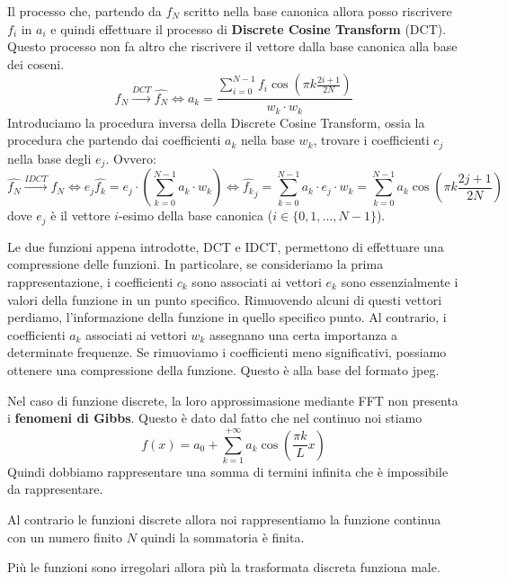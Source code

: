 Il processo che, partendo da $f_N$ scritto nella base canonica allora posso
riscrivere $f_i$ in $a_i$ e quindi effettuare il processo di \textbf{Discrete
    Cosine Transform} (DCT). Questo processo non fa altro che riscrivere il
vettore dalla base canonica alla base dei coseni.
\begin{equation*}
    f_N \stackrel{DCT}{\to } \hat{f_N} \iff a_k = \frac{\sum_{i = 0}^{N-1}f_i\cos
        \left(\pi k \frac{2i +1}{2N}\right)}{w_k\cdot w_k}
\end{equation*}
Introduciamo la procedura inversa della Discrete Cosine Transform, ossia la
procedura che partendo dai coefficienti $a_k$ nella base $w_k$, trovare i
coefficienti $c_j$ nella base degli $e_j$. Ovvero:
\begin{equation*}
    \hat{f_N} \stackrel{IDCT}{\to} f_N \iff e_j \hat{f_k} = e_j \cdot
    \left(\sum_{k=0}^{N-1}a_k \cdot w_k\right) \iff \hat{f_k}_j = \sum_{k=0}^{N-1}
    a_k \cdot e_j \cdot w_k = \sum_{k=0}^{N-1} a_k \cos\left(\pi k \frac{2j+1}{2N}\right)
\end{equation*}
dove $e_j$ è il vettore $i$-esimo della base canonica ($i\in \{0,1,\dots, N-1\}$).

Le due funzioni appena introdotte, DCT e IDCT, permettono di effettuare una
compressione delle funzioni. In particolare, se consideriamo la prima rappresentazione,
i coefficienti $c_k$ sono associati ai vettori $e_k$ sono essenzialmente i valori
della funzione in un punto specifico. Rimuovendo alcuni di questi vettori perdiamo,
l'informazione della funzione in quello specifico punto. Al contrario, i coefficienti
$a_k$ associati ai vettori $w_k$ assegnano una certa importanza a determinate
frequenze. Se rimuoviamo i coefficienti meno significativi, possiamo ottenere una
compressione della funzione. Questo è alla base del formato jpeg.

\begin{nota}
    Nel caso di funzione discrete, la loro approssimasione mediante FFT non 
    presenta i \textbf{fenomeni di Gibbs}. Questo è dato dal fatto che nel continuo 
    noi stiamo
    $$f(x)=a_0+\sum_{k=1}^{+\infty} a_k\cos (\frac{\pi k}{L}x)$$
    Quindi dobbiamo rappresentare una somma di termini infinita che è impossibile 
    da rappresentare.
    
    Al contrario le funzioni discrete allora noi rappresentiamo la funzione continua
    con un numero finito $N$ quindi la sommatoria è finita.
\end{nota}

\begin{nota}
    Più le funzioni sono irregolari allora più la trasformata discreta funziona 
    male.
\end{nota}


